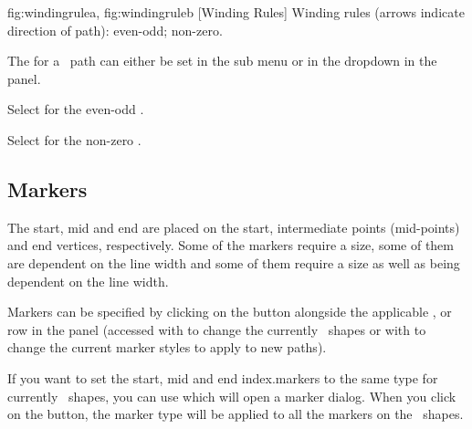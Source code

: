 {
 {fig:windingrulea}{}{},
 {fig:windingruleb}{}{}
}
[Winding Rules]
{Winding rules (arrows indicate direction of path):
 even-odd;
 non-zero.}


The  for a \selected\ path can either be set
in the  sub menu or in the
 \gls{dropdown} in the
 panel.


Select  for the even-odd 
.


Select  for the non-zero 
.


\subsection{Markers}\label{sec:markers}

The start, mid and end  are placed on
the start, intermediate points (mid-points) and end vertices, respectively. Some of the
markers require a size, some of them are dependent on the line width
and some of them require a size as well as being dependent on the
line width.

Markers can be specified by clicking on the 
button alongside the applicable ,
 or 
row in the  panel (accessed with 
to change the currently \selected\ shapes or with
 to change the current marker styles to apply
to new \glspl{path}).


If you want to set the start, mid and end \glspl{index.marker} to
the same type for currently \selected\ shapes, you can use
 which will open a marker dialog.
When you click on the  button, the marker type
will be applied to all the markers on the \selected\ shapes.


